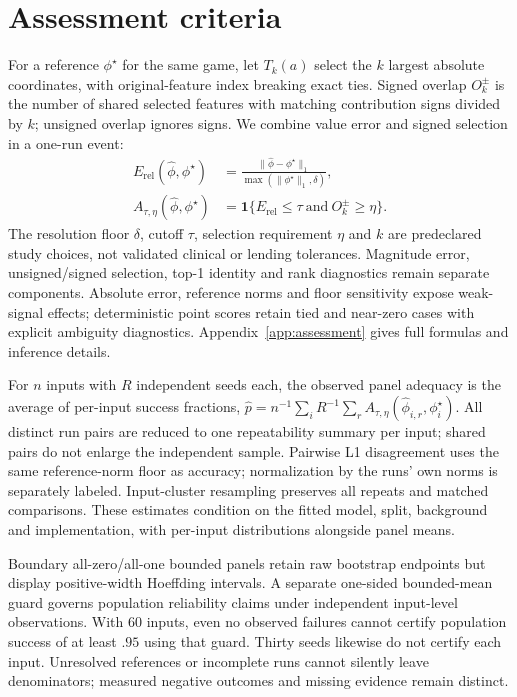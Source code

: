 \section{Assessment criteria}
\label{sec:assessment}

For a reference $\phi^\star$ for the same game, let $T_k(a)$ select the $k$ largest absolute coordinates, with original-feature index breaking exact ties. Signed overlap $O_k^\pm$ is the number of shared selected features with matching contribution signs divided by $k$; unsigned overlap ignores signs. We combine value error and signed selection in a one-run event:
\begin{equation}
 \begin{aligned}
 E_{\mathrm{rel}}(\widehat\phi,\phi^\star)
 &=\frac{\|\widehat\phi-\phi^\star\|_1}{\max(\|\phi^\star\|_1,\delta)},\\
 A_{\tau,\eta}(\widehat\phi,\phi^\star)
 &=\mathbf{1}\{E_{\mathrm{rel}}\leq\tau\ \text{and}\ O_k^\pm\geq\eta\}.
 \end{aligned}
 \label{eq:adequacy}
\end{equation}
The resolution floor $\delta$, cutoff $\tau$, selection requirement $\eta$ and $k$ are predeclared study choices, not validated clinical or lending tolerances. Magnitude error, unsigned/signed selection, top-1 identity and rank diagnostics remain separate components. Absolute error, reference norms and floor sensitivity expose weak-signal effects; deterministic point scores retain tied and near-zero cases with explicit ambiguity diagnostics. Appendix~\ref{app:assessment} gives full formulas and inference details.

For $n$ inputs with $R$ independent seeds each, the observed panel adequacy is the average of per-input success fractions, $\widehat p=n^{-1}\sum_i R^{-1}\sum_r A_{\tau,\eta}(\widehat\phi_{i,r},\phi_i^\star)$. All distinct run pairs are reduced to one repeatability summary per input; shared pairs do not enlarge the independent sample. Pairwise L1 disagreement uses the same reference-norm floor as accuracy; normalization by the runs' own norms is separately labeled. Input-cluster resampling preserves all repeats and matched comparisons. These estimates condition on the fitted model, split, background and implementation, with per-input distributions alongside panel means.

Boundary all-zero/all-one bounded panels retain raw bootstrap endpoints but display positive-width Hoeffding intervals. A separate one-sided bounded-mean guard governs population reliability claims under independent input-level observations. With 60 inputs, even no observed failures cannot certify population success of at least $.95$ using that guard. Thirty seeds likewise do not certify each input. Unresolved references or incomplete runs cannot silently leave denominators; measured negative outcomes and missing evidence remain distinct.
